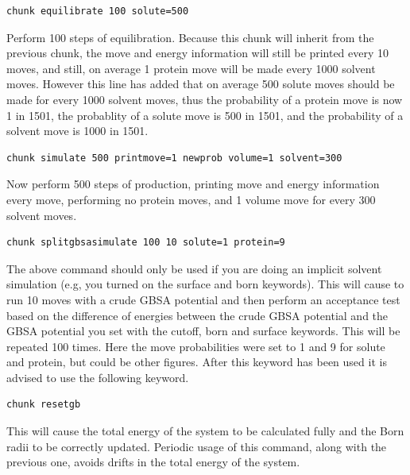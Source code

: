 \documentclass[letterpaper,10pt,english]{sphinxmanual}
\begin{document}
\begin{Verbatim}[commandchars=\\\{\}]
chunk equilibrate 100 solute=500
\end{Verbatim}

Perform 100 steps of equilibration. Because this chunk will inherit from the previous chunk, the move and energy information will still be printed every 10 moves, and still, on average 1 protein move will be made every 1000 solvent moves. However this line has added that on average 500 solute moves should be made for every 1000 solvent moves, thus the probability of a protein move is now 1 in 1501, the probablity of a solute move is 500 in 1501, and the probability of a solvent move is 1000 in 1501.

\begin{Verbatim}[commandchars=\\\{\}]
chunk simulate 500 printmove=1 newprob volume=1 solvent=300
\end{Verbatim}

Now perform 500 steps of production, printing move and energy information every move, performing no protein moves, and 1 volume move for every 300 solvent moves.

\begin{Verbatim}[commandchars=\\\{\}]
chunk splitgbsasimulate 100 10 solute=1 protein=9
\end{Verbatim}

The above command should only be used if you are doing an implicit solvent simulation (e.g, you turned on the surface and born keywords). This will cause to run 10 moves with a crude GBSA potential and then perform an acceptance test based on the difference of energies between the crude GBSA potential and the GBSA potential you set with the cutoff, born and surface keywords. This will be repeated 100 times. Here the move probabilities were set to 1 and 9 for solute and protein, but could be other figures. After this keyword has been used it is advised to use the following keyword.

\begin{Verbatim}[commandchars=\\\{\}]
chunk resetgb
\end{Verbatim}

This will cause the total energy of the system to be calculated fully and the Born radii to be correctly updated. Periodic usage of this command, along with the previous one, avoids drifts in the total energy of the system.
\end{document}
